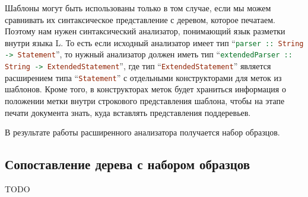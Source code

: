 Шаблоны могут быть использованы только в том случае, если мы можем сравнивать их синтаксическое представление с деревом, которое печатаем. Поэтому нам нужен синтаксический анализатор, понимающий язык разметки внутри языка L. То есть если исходный анализатор имеет тип “\lstinline[language=Haskell]{parser :: String -> Statement}”, то нужный анализатор должен иметь тип “\lstinline[language=Haskell]{extendedParser :: String -> ExtendedStatement}”, где тип “\lstinline[language=Haskell]{ExtendedStatement}” является расширением типа “\lstinline[language=Haskell]{Statement}” с отдельными конструкторами для меток из шаблонов. Кроме того, в конструкторах меток будет храниться информация о положении метки внутри строкового представления шаблона, чтобы на этапе печати документа знать, куда вставлять представления поддеревьев.

В результате работы расширенного анализатора получается набор образцов.


% 	

% 	


\subsection{Сопоставление дерева с набором образцов}

TODO


